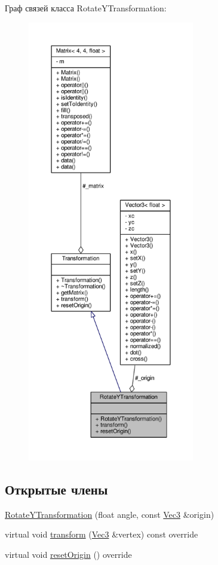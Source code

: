 Граф связей класса Rotate\+Y\+Transformation\+:
\nopagebreak
\begin{figure}[H]
\begin{center}
\leavevmode
\includegraphics[height=550pt]{db/d63/class_rotate_y_transformation__coll__graph}
\end{center}
\end{figure}
\subsection*{Открытые члены}
\begin{DoxyCompactItemize}
\item 
\hyperlink{class_rotate_y_transformation_af692fec1a0450a064a5156d926ea05b7}{Rotate\+Y\+Transformation} (float angle, const \hyperlink{vec3_8h_a221ad8ea4d9be4111628ee1ca22ee3ba}{Vec3} \&origin)
\item 
virtual void \hyperlink{class_rotate_y_transformation_adaed2a21b00aa575007754d15335e7e8}{transform} (\hyperlink{vec3_8h_a221ad8ea4d9be4111628ee1ca22ee3ba}{Vec3} \&vertex) const override
\item 
virtual void \hyperlink{class_rotate_y_transformation_affca7c164fd1385996174e2e58089203}{reset\+Origin} () override
\end{DoxyCompactItemize}

